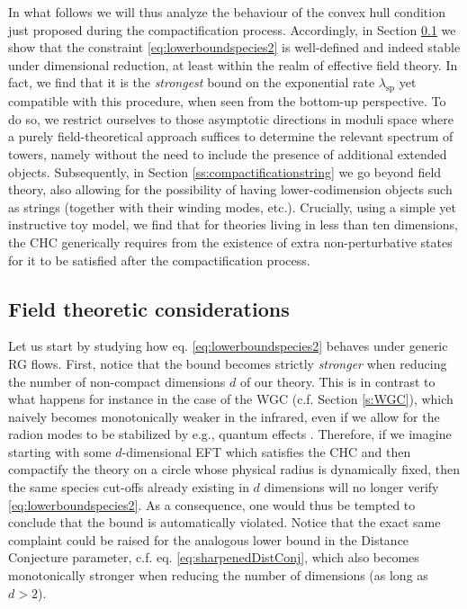 In what follows we will thus analyze the behaviour of the convex hull condition just proposed during the compactification process. Accordingly, in Section \ref{ss:field-theory} we show that the constraint \eqref{eq:lowerboundspecies2} is well-defined and indeed stable under dimensional reduction, at least within the realm of effective field theory. In fact, we find that it is the \emph{strongest} bound on the exponential rate $\lambda_{\text{sp}}$ yet compatible with this procedure, when seen from the bottom-up perspective. To do so, we restrict ourselves to those asymptotic directions in moduli space where a purely field-theoretical approach suffices to determine the relevant spectrum of towers, namely without the need to include the presence of additional extended objects. Subsequently, in Section \ref{ss:compactificationstring} we go beyond field theory, also allowing for the possibility of having lower-codimension objects such as strings (together with their winding modes, etc.). Crucially, using a simple yet instructive toy model, we find that for theories living in less than ten dimensions, the CHC generically requires from the existence of extra non-perturbative states for it to be satisfied after the compactification process.

\subsection{Field theoretic considerations} 
\label{ss:field-theory}

Let us start by studying how eq. \eqref{eq:lowerboundspecies2} behaves under generic RG flows. First, notice that the bound becomes strictly \emph{stronger} when reducing the number of non-compact dimensions $d$ of our theory. This is in contrast to what happens for instance in the case of the WGC (c.f. Section \ref{s:WGC}), which naively becomes monotonically weaker in the infrared, even if we allow for the radion modes to be stabilized by e.g., quantum effects \cite{Heidenreich:2015nta}. Therefore, if we imagine starting with some $d$-dimensional EFT which satisfies the CHC and then compactify the theory on a circle whose physical radius is dynamically fixed, then the same species cut-offs already existing in $d$ dimensions will no longer verify \eqref{eq:lowerboundspecies2}. As a consequence, one would thus be tempted to conclude that the bound is automatically violated. Notice that the exact same complaint could be raised for the analogous lower bound in the Distance Conjecture parameter, c.f. eq. \eqref{eq:sharpenedDistConj}, which also becomes monotonically stronger when reducing the number of dimensions (as long as $d>2$). 

